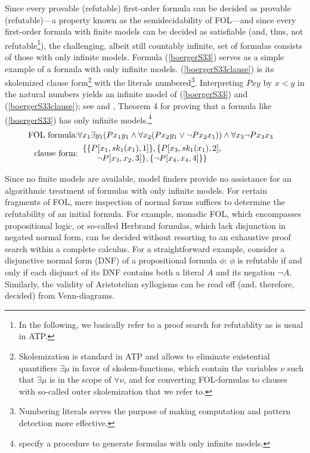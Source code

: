 \documentclass[%
  manuscript=article,   %
  year=2024,
  volume=77,
  doi=00000.000,
]{zfn}
\begin{document}
Since every provable (refutable) first-order formula can be decided as provable (refutable)---a property known as the semidecidability of FOL---and since every first-order formula with finite models can be decided as satisfiable (and, thus, not refutable\footnote{In the following, we basically refer to a proof search for refutablity as is usual in ATP.}), the challenging, albeit still countably infinite, set of formulas consists of those with only infinite models. Formula (\ref{boergerS33}) serves as a simple example of a formula with only infinite models. (\ref{boergerS33clause}) is its skolemized clause form\footnote{Skolemization is standard in ATP and allows to eliminate existential quantifiers $\exists \mu$ in favor of skolem-functions, which contain the variables $\nu$ such that $\exists \mu$ is in the scope of $\forall \nu$, \parencite[cf.][chapter 5.5]{Baaz_et_al} and \parencite[][chapter 6.3 and 6.5]{NonnengartWeidenbach} for converting FOL-formulas to clauses with so-called outer skolemization that we refer to.} with the literals numbered\footnote{Numbering literals serves the purpose of making computation and pattern detection more effective.}. Interpreting $Pxy$ by $x<y$ in the natural numbers yields an infinite model of (\ref{boergerS33}) and (\ref{boergerS33clause}); see \parencite[][p. 33]{Boerger_et_al} and \parencite{LampertNakano}, Theorem 4 for proving that a formula like (\ref{boergerS33}) has only infinite models.\footnote{\parencite{LampertNakano} specify a procedure to generate formulas with only infinite models.}
\renewcommand{\arraystretch}{1.25}
\begin{eqnarray}
\mbox{FOL formula:} & \forall x_{1}\exists y_{1} (Px_{1}y_{1} \wedge \forall x_{2}(Px_{2}y_{1} \vee \neg Px_{2}x_{1})) \wedge   \forall x_{3} \neg Px_{3}x_{3} &  \label{boergerS33}\\
\mbox{clause form:} & \begin{tabular}{c}$\{\{P[x_{1}, sk_1(x_{1}), 1]\}, \{P[x_{3}, sk_1(x_{1}), 2],$\\
 $\neg P[x_{3}, x_{2}, 3]\}, \{\neg P[x_{4},x_{4}, 4]\}\}$\end{tabular} &  \label{boergerS33clause}
\end{eqnarray}

Since no finite models are available, model finders provide no assistance for an algorithmic treatment of formulas with only infinite models. For certain fragments of FOL, mere inspection of normal \label{normalforms} forms suffices to determine the refutability of an initial formula. For example, monadic FOL, which encompasses propositional logic, or so-called Herbrand formulas, which lack disjunction in negated normal form, can be decided without resorting to an exhaustive proof search within a complete calculus. For a straightforward example, consider a disjunctive normal form (DNF) of a propositional formula $\phi$: $\phi$ is refutable if and only if each disjunct of its DNF contains both a literal $A$ and its negation $\neg A$. Similarly, the validity of Aristotelian syllogisms can be read off (and, therefore, decided) from Venn-diagrams.
\end{document}
